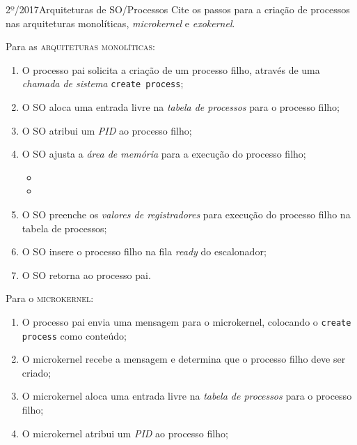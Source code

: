 \begin{exercicio}
  {2º/2017}{Arquiteturas de SO/Processos}
  {Cite os passos para a criação de processos nas arquiteturas monolíticas, \textit{microkernel} e \textit{exokernel}.}

  Para as \textsc{arquiteturas monolíticas}:
  \begin{enumerate}
    \item O processo pai solicita a criação de um processo filho, através de uma \textit{chamada de sistema} \texttt{create process};

    \item O SO aloca uma entrada livre na \textit{tabela de processos} para o processo filho;

    \item O SO atribui um \textit{PID} ao processo filho;

    \item O SO ajusta a \textit{área de memória} para a execução do processo filho;
    \begin{itemize}
      \item %
      \item %
    \end{itemize}

    \item O SO preenche os \textit{valores de registradores} para execução do processo filho na tabela de processos;

    \item O SO insere o processo filho na fila \textit{ready} do escalonador;

    \item O SO retorna ao processo pai.
  \end{enumerate}

  Para o \textsc{microkernel}:
  \begin{enumerate}
    \item O processo pai envia uma mensagem para o microkernel, colocando o \texttt{create process} como conteúdo;

    \item O microkernel recebe a mensagem e determina que o processo filho deve ser criado;

    \item O microkernel aloca uma entrada livre na \textit{tabela de processos} para o processo filho;

    \item O microkernel atribui um \textit{PID} ao processo filho;


\end{enumerate}
\end{exercicio}
